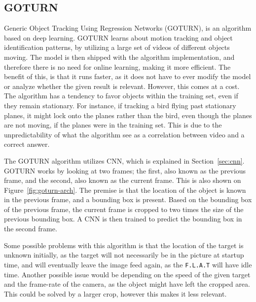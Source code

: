 \subsection{GOTURN}
Generic Object Tracking Using Regression Networks (GOTURN), is an algorithm based on deep learning\cite{goturn}.
GOTURN learns about motion tracking and object identification patterns, by utilizing a large set of videos of different objects moving.
The model is then shipped with the algorithm implementation, and therefore there is no need for online learning, making it more efficient.
The benefit of this, is that it runs faster, as it does not have to ever modify the model or analyze whether the given result is relevant.
However, this comes at a cost. 
The algorithm has a tendency to favor objects within the training set, even if they remain stationary.
For instance, if tracking a bird flying past stationary planes, it might lock onto the planes rather than the bird, even though the planes are not moving, if the planes were in the training set.
This is due to the unpredictability of what the algorithm see as a correlation between video and a correct answer.


The GOTURN algorithm utilizes CNN, which is explained in Section~\ref{sec:cnn}.
GOTURN works by looking at two frames; the first, also known as the previous frame, and the second, also known as the current frame.
This is also shown on Figure~\ref{fig:goturn-arch}.
The premise is that the location of the object is known in the previous frame, and a bounding box is present.
Based on the bounding box of the previous frame, the current frame is cropped to two times the size of the previous bounding box.
A CNN is then trained to predict the bounding box in the second frame.

Some possible problems with this algorithm is that the location of the target is unknown initially, as the target will not necessarily be in the picture at startup time, and will eventually leave the image feed again, as the \texttt{F.L.A.T} will have idle time.
Another possible issue would be depending on the speed of the given target and the frame-rate of the camera, as the object might have left the cropped area. 
This could be solved by a larger crop, however this makes it less relevant.


